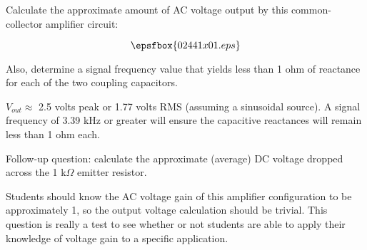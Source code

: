 

Calculate the approximate amount of AC voltage output by this common-collector amplifier circuit:

$$\epsfbox{02441x01.eps}$$

Also, determine a signal frequency value that yields less than 1 ohm of reactance for each of the two coupling capacitors.







$V_{out} \approx$ 2.5 volts peak or 1.77 volts RMS (assuming a sinusoidal source).  A signal frequency of 3.39 kHz or greater will ensure the capacitive reactances will remain less than 1 ohm each.

\vskip 10pt

Follow-up question: calculate the approximate (average) DC voltage dropped across the 1 k$\Omega$ emitter resistor.







Students should know the AC voltage gain of this amplifier configuration to be approximately 1, so the output voltage calculation should be trivial.  This question is really a test to see whether or not students are able to apply their knowledge of voltage gain to a specific application.




